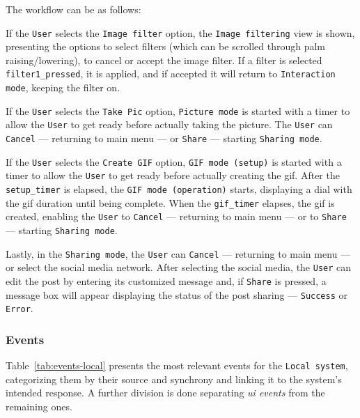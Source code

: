 The workflow can be as follows:
\begin{item-c}
\item If the \texttt{User} selects the \texttt{Image filter} option, the
  \texttt{Image filtering} view is shown, presenting the options to select
  filters (which can be scrolled through palm raising/lowering), to cancel or
  accept the image filter. If a filter is selected \texttt{filter1\_pressed}, it
  is applied, and if accepted it will return to \texttt{Interaction mode},
  keeping the filter on.
\item If the \texttt{User} selects the \texttt{Take Pic} option, \texttt{Picture
  mode} is started with a timer to allow the \texttt{User} to get ready before
actually taking the picture. The \texttt{User} can \texttt{Cancel} --- returning
to main menu --- or \texttt{Share} --- starting \texttt{Sharing mode}.
\item If the \texttt{User} selects the \texttt{Create GIF} option, \texttt{GIF
    mode (setup)} is started with a timer to allow the \texttt{User} to get
  ready before actually creating the \gls{gif}. After the \texttt{setup\_timer}
  is elapsed, the \texttt{GIF mode (operation)} starts, displaying a dial with
  the \gls{gif} duration until being complete. When the \texttt{gif\_timer}
  elapses, the \gls{gif} is created, enabling the \texttt{User} to
  \texttt{Cancel} --- returning to main menu --- or to \texttt{Share} ---
  starting \texttt{Sharing mode}.
\item Lastly, in the \texttt{Sharing mode}, the \texttt{User} can
  \texttt{Cancel} --- returning to main menu --- or select the
  social media network. After selecting the social media, the \texttt{User} can
  edit the post by entering its customized message and, if \texttt{Share} is
  pressed, a message box will appear displaying the status of the post sharing
  --- \texttt{Success} or \texttt{Error}.
\end{item-c}
%
\subsubsection{Events}%
\label{sec:events}
Table~\ref{tab:events-local} presents the most relevant events for the
\texttt{Local system}, categorizing them by their source and synchrony and
linking it to the system's intended response. A further division is done
separating \emph{\gls{ui} events} from the remaining ones.

